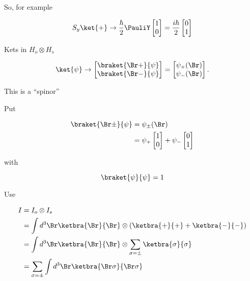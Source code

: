 So, for example

\begin{equation}\label{eqn:qmTwoL14:170}
S_y\ket{+} \rightarrow \frac{\hbar}{2} \PauliY
\begin{bmatrix}
1 \\
0
\end{bmatrix} =
\frac{i\hbar}{2}
\begin{bmatrix}
0 \\
1
\end{bmatrix} 
\end{equation}

Kets in $H_o \otimes H_s$

\begin{equation}\label{eqn:qmTwoL14:50}
\ket{\psi} \rightarrow 
\begin{bmatrix}
\braket{\Br+}{\psi} \\
\braket{\Br-}{\psi}
\end{bmatrix}
=
\begin{bmatrix}
\psi_{+}(\Br) \\
\psi_{-}(\Br)
\end{bmatrix}.
\end{equation}

This is a ``spinor''

Put 

\begin{equation}\label{eqn:qmTwoL14:660}
\begin{aligned}
\braket{\Br \pm}{\psi}
&= \psi_{\pm}(\Br) \\
&= 
\psi_{+} 
\begin{bmatrix}
1 \\
0
\end{bmatrix}
+
\psi_{-} 
\begin{bmatrix}
0 \\
1 
\end{bmatrix}
\end{aligned}
\end{equation}

with 

\begin{equation}\label{eqn:qmTwoL14:680}
\braket{\psi}{\psi} = 1
\end{equation}

Use

\begin{equation}\label{eqn:qmTwoL14:700}
\begin{aligned}
I 
&= I_o \otimes I_s \\
&= 
\int d^3 \Br \ketbra{\Br}{\Br} \otimes \left( 
\ketbra{+}{+}
+
\ketbra{-}{-}
\right) \\
&=
\int d^3 \Br \ketbra{\Br}{\Br} \otimes \sum_{\sigma=\pm} 
\ketbra{\sigma}{\sigma} \\
&=
\sum_{\sigma = \pm} 
\int d^3 \Br \ketbra{\Br \sigma}{\Br \sigma} 
\end{aligned}
\end{equation}

